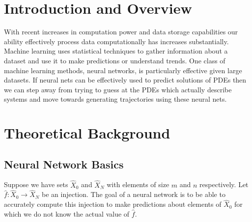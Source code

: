 \documentclass[10pt]{article}
\begin{document}

\section{Introduction and Overview}
With recent increases in computation power and data storage capabilities our ability effectively process data computationally has increases substantially. Machine learning uses statistical techniques to gather information about a dataset and use it to make predictions or understand trends. One class of machine learning methods, neural networks, is particularly effective given large datasets. If neural nets can be effectively used to predict solutions of PDEs then we can step away from trying to guess at the PDEs which actually describe systems and move towards generating trajectories using these neural nets.

\section{Theoretical Background}
\subsection{Neural Network Basics}
Suppose we have sets \( \hat{X}_0 \) and \( \hat{X}_N \) with elements of size \( m \) and \( n \) respectively. Let \( \hat{f}:\hat{X}_0 \to \hat{X}_N \) be an injection. The goal of a neural network is to be able to accurately compute this injection to make predictions about elements of \( \hat{X}_0 \) for which we do not know the actual value of \( \hat{f} \).
\end{document}
